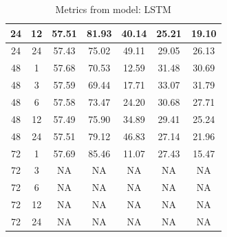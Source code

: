 \begin{table}[H]
\begin{tabular}{|c|c||c|c|c|c|c|}
		\hline
		24 & 12 & 57.51 & 81.93 & 40.14 & 25.21 & 19.10 \\
		\hline
		24 & 24 & 57.43 & 75.02 & 49.11 & 29.05 & 26.13 \\
		\hline
		48 &  1 & 57.68 & 70.53 & 12.59 & 31.48 & 30.69 \\
		\hline
		48 &  3 & 57.59 & 69.44 & 17.71 & 33.07 & 31.79 \\
		\hline
		48 &  6 & 57.58 & 73.47 & 24.20 & 30.68 & 27.71 \\
		\hline
		48 & 12 & 57.49 & 75.90 & 34.89 & 29.41 & 25.24 \\
		\hline
		48 & 24 & 57.51 & 79.12 & 46.83 & 27.14 & 21.96 \\
		\hline
		72 &  1 & 57.69 & 85.46 & 11.07 & 27.43 & 15.47 \\
		\hline
		72 &  3 &    NA &    NA &    NA &    NA &    NA \\
		\hline
		72 &  6 &    NA &    NA &    NA &    NA &    NA \\
		\hline
		72 & 12 &    NA &    NA &    NA &    NA &    NA \\
		\hline
		72 & 24 &    NA &    NA &    NA &    NA &    NA \\
		\hline
	\end{tabular}
	\caption{Metrics from model: LSTM}
	\label{tbl:lstm}
\end{table}

